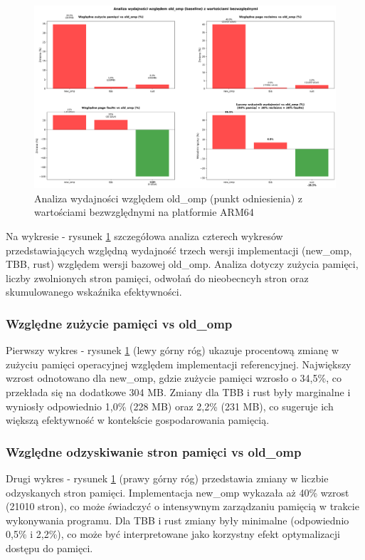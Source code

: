 \begin{figure}[H]
    \centering
    \includegraphics[width=\textwidth]{analiza/images/parallel/cg/arm/chart_05_performance_ratios.png}
    \caption{Analiza wydajności względem old\_omp (punkt odniesienia) z wartościami bezwzględnymi na platformie ARM64}
    \label{cg_analiza_wzgledem_old_omp}
\end{figure}
Na wykresie - rysunek \ref{cg_analiza_wzgledem_old_omp} szczegółowa analiza czterech wykresów przedstawiających względną wydajność trzech wersji implementacji (new\_omp, TBB, rust) względem wersji bazowej old\_omp. Analiza dotyczy zużycia pamięci, liczby zwolnionych stron pamięci, odwołań do nieobecncyh stron oraz skumulowanego wskaźnika efektywności.
\subsubsection{Względne zużycie pamięci vs old\_omp}
Pierwszy wykres - rysunek \ref{cg_analiza_wzgledem_old_omp} (lewy górny róg) ukazuje procentową zmianę w zużyciu pamięci operacyjnej względem implementacji referencyjnej. Największy wzrost odnotowano dla new\_omp, gdzie zużycie pamięci wzrosło o 34,5\%, co przekłada się na dodatkowe 304 MB. Zmiany dla TBB i rust były marginalne i wyniosły odpowiednio 1,0\% (228 MB) oraz 2,2\% (231 MB), co sugeruje ich większą efektywność w kontekście gospodarowania pamięcią.

\subsubsection{Względne odzyskiwanie stron pamięci vs old\_omp}
Drugi wykres - rysunek \ref{cg_analiza_wzgledem_old_omp} (prawy górny róg) przedstawia zmiany w liczbie odzyskanych stron pamięci. Implementacja new\_omp wykazała aż 40\% wzrost (21010 stron), co może świadczyć o intensywnym zarządzaniu pamięcią w trakcie wykonywania programu. Dla TBB i rust zmiany były minimalne (odpowiednio 0,5\% i 2,2\%), co może być interpretowane jako korzystny efekt optymalizacji dostępu do pamięci.


